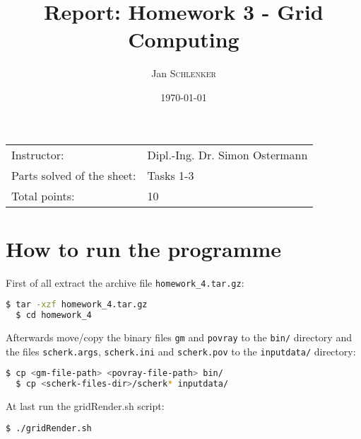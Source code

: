\documentclass{article}
\title{Report: Homework 3 - Grid Computing}%
\author{Jan \textsc{Schlenker}} %
\date{\today} %
\begin{document}
\maketitle %

\begin{center}
\begin{tabular}{l l}
Instructor: & Dipl.-Ing. Dr. Simon Ostermann \\
Parts solved of the sheet: & Tasks 1-3 \\
Total points: & 10
\end{tabular}
\end{center}



\section{How to run the programme}

First of all extract the archive file \texttt{homework\_4.tar.gz}:

\begin{lstlisting}[language=bash, deletekeywords={cd}]
  $ tar -xzf homework_4.tar.gz
  $ cd homework_4
\end{lstlisting}

Afterwards move/copy the binary files \texttt{gm} and \texttt{povray} to the \texttt{bin/} directory and the files \texttt{scherk.args}, \texttt{scherk.ini} and \texttt{scherk.pov} to the \texttt{inputdata/} directory:

\begin{lstlisting}[language=bash]
  $ cp <gm-file-path> <povray-file-path> bin/
  $ cp <scherk-files-dir>/scherk* inputdata/
\end{lstlisting}

At last run the gridRender.sh script:

\begin{lstlisting}[language=bash]
  $ ./gridRender.sh
\end{lstlisting}

\end{document}
